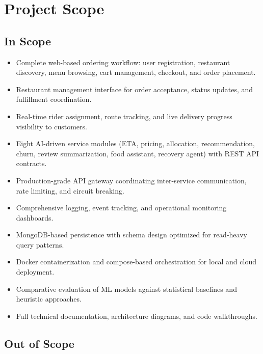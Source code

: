 \documentclass[12pt,a4paper]{report}
\begin{document}
\section{Project Scope}

\subsection{In Scope}

\begin{itemize}
    \item Complete web-based ordering workflow: user registration, restaurant discovery, menu browsing, cart management, checkout, and order placement.
    \item Restaurant management interface for order acceptance, status updates, and fulfillment coordination.
    \item Real-time rider assignment, route tracking, and live delivery progress visibility to customers.
    \item Eight AI-driven service modules (ETA, pricing, allocation, recommendation, churn, review summarization, food assistant, recovery agent) with REST API contracts.
    \item Production-grade API gateway coordinating inter-service communication, rate limiting, and circuit breaking.
    \item Comprehensive logging, event tracking, and operational monitoring dashboards.
    \item MongoDB-based persistence with schema design optimized for read-heavy query patterns.
    \item Docker containerization and compose-based orchestration for local and cloud deployment.
    \item Comparative evaluation of ML models against statistical baselines and heuristic approaches.
    \item Full technical documentation, architecture diagrams, and code walkthroughs.
\end{itemize}

\subsection{Out of Scope}
\end{document}
